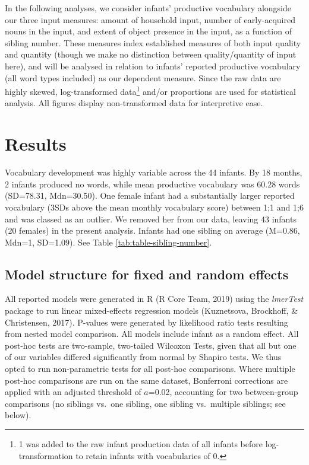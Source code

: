 \documentclass[
  english,
  man,floatsintext]{apa6}
\begin{document}
In the following analyses, we consider infants' productive vocabulary alongside our three input measures: amount of household input, number of early-acquired nouns in the input, and extent of object presence in the input, as a function of sibling number. These measures index established measures of both input quality and quantity (though we make no distinction between quality/quantity of input here), and will be analysed in relation to infants' reported productive vocabulary (all word types included) as our dependent measure. Since the raw data are highly skewed, log-transformed data\footnote{1 was added to the raw infant production data of all infants before log-transformation to retain infants with vocabularies of 0.} and/or proportions are used for statistical analysis. All figures display non-transformed data for interpretive ease.

\hypertarget{results}{%
\section{Results}\label{results}}

Vocabulary development was highly variable across the 44 infants. By 18 months, 2 infants produced no words, while mean productive vocabulary was 60.28 words (SD=78.31, Mdn=30.50). One female infant had a substantially larger reported vocabulary (3SDs above the mean monthly vocabulary score) between 1;1 and 1;6 and was classed as an outlier. We removed her from our data, leaving 43 infants (20 females) in the present analysis. Infants had one sibling on average (M=0.86, Mdn=1, SD=1.09). See Table \ref{tab:table-sibling-number}.

\hypertarget{model-structure-for-fixed-and-random-effects}{%
\subsection{Model structure for fixed and random effects}\label{model-structure-for-fixed-and-random-effects}}

All reported models were generated in R (R Core Team, 2019) using the \emph{lmerTest} package to run linear mixed-effects regression models (Kuznetsova, Brockhoff, \& Christensen, 2017). P-values were generated by likelihood ratio tests resulting from nested model comparison. All models include infant as a random effect. All post-hoc tests are two-sample, two-tailed Wilcoxon Tests, given that all but one of our variables differed significantly from normal by Shapiro tests. We thus opted to run non-parametric tests for all post-hoc comparisons. Where multiple post-hoc comparisons are run on the same dataset, Bonferroni corrections are applied with an adjusted threshold of \(a\)=0.02, accounting for two between-group comparisons (no siblings vs.~one sibling, one sibling vs.~multiple siblings; see below).
\end{document}
